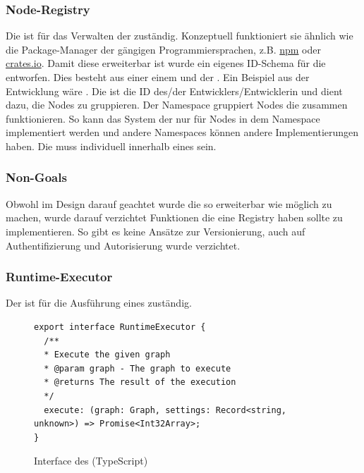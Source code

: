 \documentclass[ngerman]{article}
\begin{document}
\subsubsection{Node-Registry}
\label{sec:node_registry}

Die  ist für das Verwalten der  zuständig. Konzeptuell funktioniert sie ähnlich wie die Package-Manager der gängigen Programmiersprachen, z.B. \href{https://www.npmjs.com/}{npm} oder \href{https://crates.io/}{crates.io}.
\br
Damit diese  erweiterbar ist wurde ein eigenes ID-Schema für die  entworfen. Dies besteht aus einer  einem  und der . 
Ein Beispiel aus der Entwicklung wäre .
\br
Die  ist die ID des/der Entwicklers/Entwicklerin und dient dazu, die Nodes zu gruppieren. Der Namespace gruppiert Nodes die zusammen funktionieren. So kann das System der  nur für Nodes in dem  Namespace implementiert werden und andere Namespaces können andere Implementierungen haben.
\br
Die  muss individuell innerhalb eines  sein. 
\subsubsection*{Non-Goals}
Obwohl im Design darauf geachtet wurde die  so erweiterbar wie möglich zu machen, wurde darauf verzichtet Funktionen die eine  Registry haben sollte zu implementieren. So gibt es keine Ansätze zur Versionierung, auch auf Authentifizierung und Autorisierung wurde verzichtet.

\pagebreak

\subsubsection{Runtime-Executor}
\label{sec:runtime_executor}

Der  ist für die Ausführung eines  zuständig.

\begin{figure}[htbp]
  \begin{code}
    \begin{verbatim}
export interface RuntimeExecutor {
  /**
  * Execute the given graph
  * @param graph - The graph to execute
  * @returns The result of the execution
  */
  execute: (graph: Graph, settings: Record<string, unknown>) => Promise<Int32Array>;
}
    \end{verbatim}
  \end{code}
  \caption{Interface des  (TypeScript)}
  \label{fig:runtime_executor}
\end{figure}
\end{document}
